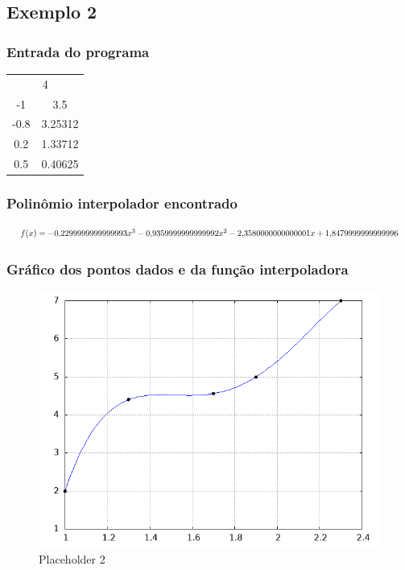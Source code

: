 \documentclass{article}
\begin{document}
    \subsection{Exemplo 2}

            \subsubsection{Entrada do programa}
            \begin{table}[ht!]
                \centering
                \begin{tabular}{cc}
                    \multicolumn{2}{c}{4} \\
                    -1   & 3.5 \\
                    -0.8 & 3.25312 \\
                    0.2  & 1.33712 \\
                    0.5  & 0.40625 \\
                \end{tabular}
            \end{table}


            \subsubsection{Polinômio interpolador encontrado}
            \begin{equation*}
                \resizebox{\textwidth}{!}{$
                f(x) = -0{,}2299999999999993x^3 - 0{,}9359999999999992x^2 - 2{,}3580000000000001x + 1{,}8479999999999996
                $}
            \end{equation*}


            \subsubsection{Gráfico dos pontos dados e da função interpoladora}
                \begin{figure}[H]
                    \centering
                    \includegraphics[width=0.5\linewidth]{saida.png}
                    \caption{Placeholder 2}
                    \label{fig:placeholder2}
                \end{figure}
\end{document}
